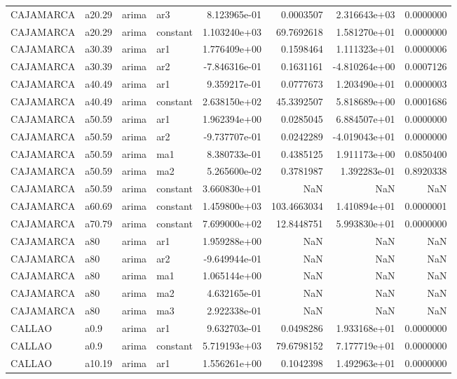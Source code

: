 \documentclass[
]{article}
\begin{document}
\begin{table}[!h]
\begin{tabular}[t]{llllrrrr}
\addlinespace
CAJAMARCA & a20.29 & arima & ar3 & 8.123965e-01 & 0.0003507 & 2.316643e+03 & 0.0000000\\
CAJAMARCA & a20.29 & arima & constant & 1.103240e+03 & 69.7692618 & 1.581270e+01 & 0.0000000\\
CAJAMARCA & a30.39 & arima & ar1 & 1.776409e+00 & 0.1598464 & 1.111323e+01 & 0.0000006\\
CAJAMARCA & a30.39 & arima & ar2 & -7.846316e-01 & 0.1631161 & -4.810264e+00 & 0.0007126\\
CAJAMARCA & a40.49 & arima & ar1 & 9.359217e-01 & 0.0777673 & 1.203490e+01 & 0.0000003\\
\addlinespace
CAJAMARCA & a40.49 & arima & constant & 2.638150e+02 & 45.3392507 & 5.818689e+00 & 0.0001686\\
CAJAMARCA & a50.59 & arima & ar1 & 1.962394e+00 & 0.0285045 & 6.884507e+01 & 0.0000000\\
CAJAMARCA & a50.59 & arima & ar2 & -9.737707e-01 & 0.0242289 & -4.019043e+01 & 0.0000000\\
CAJAMARCA & a50.59 & arima & ma1 & 8.380733e-01 & 0.4385125 & 1.911173e+00 & 0.0850400\\
CAJAMARCA & a50.59 & arima & ma2 & 5.265600e-02 & 0.3781987 & 1.392283e-01 & 0.8920338\\
\addlinespace
CAJAMARCA & a50.59 & arima & constant & 3.660830e+01 & NaN & NaN & NaN\\
CAJAMARCA & a60.69 & arima & constant & 1.459800e+03 & 103.4663034 & 1.410894e+01 & 0.0000001\\
CAJAMARCA & a70.79 & arima & constant & 7.699000e+02 & 12.8448751 & 5.993830e+01 & 0.0000000\\
CAJAMARCA & a80 & arima & ar1 & 1.959288e+00 & NaN & NaN & NaN\\
CAJAMARCA & a80 & arima & ar2 & -9.649944e-01 & NaN & NaN & NaN\\
\addlinespace
CAJAMARCA & a80 & arima & ma1 & 1.065144e+00 & NaN & NaN & NaN\\
CAJAMARCA & a80 & arima & ma2 & 4.632165e-01 & NaN & NaN & NaN\\
CAJAMARCA & a80 & arima & ma3 & 2.922338e-01 & NaN & NaN & NaN\\
CALLAO & a0.9 & arima & ar1 & 9.632703e-01 & 0.0498286 & 1.933168e+01 & 0.0000000\\
CALLAO & a0.9 & arima & constant & 5.719193e+03 & 79.6798152 & 7.177719e+01 & 0.0000000\\
\addlinespace
CALLAO & a10.19 & arima & ar1 & 1.556261e+00 & 0.1042398 & 1.492963e+01 & 0.0000000\\

\end{tabular}
\end{table}
\end{document}
